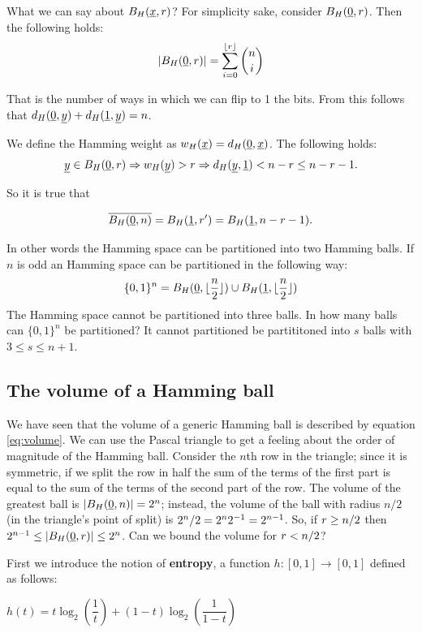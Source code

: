 What we can say about $B_H(\underline{x}, r)$? For simplicity sake, consider $B_H(\underline{0}, r)$. Then the following holds:
\begin{equation}\label{eq:volume}
	|B_H(\underline{0}, r)| = \sum_{i = 0}^{\lfloor r \rfloor} \binom{n}{i}
\end{equation}

That is the number of ways in which we can flip to 1 the bits. From this follows that $d_H(\underline{0}, \underline{y}) + d_H(\underline{1}, \underline{y}) = n$.

We define the Hamming weight as $w_H(\underline{x}) = d_H(\underline{0}, \underline{x})$. The following holds:
$$\underline{y} \in B_H(\underline{0}, r) \Rightarrow w_H(\underline{y}) > r \Rightarrow d_H(\underline{y}, \underline{1}) < n - r \leq n -r - 1.$$

So it is true that

$$\overline{B_H(\underline{0}, n)} = B_H(\underline{1}, r') = B_H(\underline{1}, n - r - 1).$$

In other words the Hamming space can be partitioned into two Hamming balls. If $n$ is odd an Hamming space can be partitioned in the following way: $$\{0, 1\}^n = B_H(\underline{0}, \lfloor \dfrac{n}{2}\rfloor ) \cup B_H(\underline{1}, \lfloor \dfrac{n}{2}\rfloor)$$
The Hamming space cannot be partitioned into three balls. In how many balls can $\{0, 1\}^n$ be partitioned? It cannot partitioned be partititoned into $s$ balls with $3 \leq s \leq n + 1$.

\subsection{The volume of a Hamming ball}
We have seen that the volume of a generic Hamming ball is described by equation \ref{eq:volume}. We can use the Pascal triangle to get a feeling about the order of magnitude of the Hamming ball. Consider the $n$th row in the triangle; since it is symmetric, if we split the row in half the sum of the terms of the first part is equal to the sum of the terms of the second part of the row. The volume of the greatest ball is $|B_H(\underline{0}, n)| = 2^n$; instead, the volume of the ball with radius $n/2$ (in the triangle's point of split) is ${2^n}/{2} = 2^n2^{-1} = 2^{n-1}$. So, if $r \geq {n}/{2}$ then $2^{n-1} \leq |B_H(\underline{0}, r)| \leq 2^n$. Can we bound the volume for $r < {n}/{2}$?

First we introduce the notion of \textbf{entropy}, a function $h: [0, 1] \rightarrow [0, 1]$ defined as follows:
\begin{center}
	$h(t) = t\log_2(\dfrac{1}{t}) + (1 - t)\log_2\left(\dfrac{1}{1-t}\right)$
\end{center}

